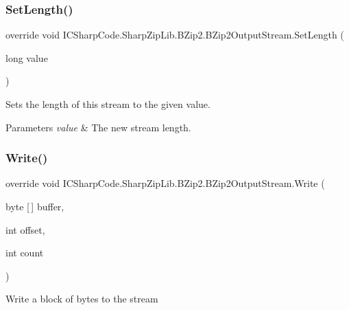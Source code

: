\subsubsection{\texorpdfstring{Set\+Length()}{SetLength()}}
{\footnotesize\ttfamily override void I\+C\+Sharp\+Code.\+Sharp\+Zip\+Lib.\+B\+Zip2.\+B\+Zip2\+Output\+Stream.\+Set\+Length (\begin{DoxyParamCaption}\item[{long}]{value }\end{DoxyParamCaption})\hspace{0.3cm}{\ttfamily [inline]}}



Sets the length of this stream to the given value. 


\begin{DoxyParams}{Parameters}
{\em value} & The new stream length.\\
\hline
\end{DoxyParams}
\mbox{\label{class_i_c_sharp_code_1_1_sharp_zip_lib_1_1_b_zip2_1_1_b_zip2_output_stream_a7dfa360fea7b90c55bf4e4de4651a34e}} 
\subsubsection{\texorpdfstring{Write()}{Write()}}
{\footnotesize\ttfamily override void I\+C\+Sharp\+Code.\+Sharp\+Zip\+Lib.\+B\+Zip2.\+B\+Zip2\+Output\+Stream.\+Write (\begin{DoxyParamCaption}\item[{byte \mbox{[}$\,$\mbox{]}}]{buffer,  }\item[{int}]{offset,  }\item[{int}]{count }\end{DoxyParamCaption})\hspace{0.3cm}{\ttfamily [inline]}}



Write a block of bytes to the stream 


